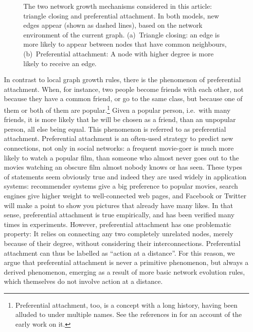 \documentclass{jimis-final-en}
\begin{document}
\begin{figure}
  \centering
  \caption{
    \label{fig:illustration}
    The two network growth mechanisms considered in this article:
    triangle closing and preferential attachment.  In both models, new
    edges appear (shown as dashed lines), based on the network
    environment of the current graph. (a)~Triangle closing:  an edge
    is more likely to appear between nodes that have common neighbours,
    (b)~Preferential attachment: A node with higher degree is more likely to 
    receive an edge.
  }
\end{figure}

In contrast to local graph growth rules, there is the phenomenon of
preferential attachment.  When, for  
instance, two people become friends with each other, not because they
have a common friend, or go to the same class, but because one of them or both of them are
popular.\footnote{Preferential attachment, too, is a concept with a long
  history, having been alluded to under multiple names.  See the
  references in \citep{kunegis:preferential-attachment} 
for an account of the early work on it.}  Given a popular
person, i.e.\ with many friends, it is 
more likely that he will be chosen as a friend, than an unpopular
person, all else being equal.  This phenomenon is
referred to as preferential attachment.  Preferential attachment is an
often-used strategy to predict new connections, not only in social
networks: a frequent movie-goer is much more likely to watch a popular
film, than someone who almost never goes out to the movies watching an
obscure film almost nobody knows or has seen.  These types of statements
seem obviously true and indeed they are used widely in application
systems: recommender systems give a big preference to popular movies,
search engines give higher weight to well-connected web pages, and
Facebook or Twitter will make a point to show you pictures that already have many
likes.  In that sense, preferential attachment is true empirically, and
has been verified many times in experiments.  
However, preferential attachment has one problematic property:  It
relies on connecting any two completely unrelated nodes, merely because
of their degree, without considering their interconnections.
Preferential attachment can thus be labelled as ``action at a
distance''.  
For this reason, we argue that
preferential attachment is never a primitive phenomenon, but always a
derived phenomenon, emerging as a result of more basic network evolution
rules, which themselves do not involve action at a distance. 
\end{document}
